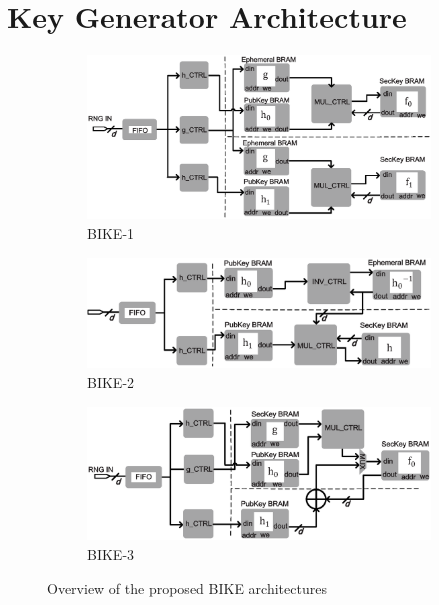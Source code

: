 \documentclass[runningheads]{llncs}
\begin{document}
\section{Key Generator Architecture}
\label{sec::keygen}
\begin{figure}[!tb]
\centering
\begin{subfigure}[t]{0.47\textwidth}\centering
\includegraphics[width=\textwidth]{./fig/BIKE-1.eps}
\caption{BIKE-1}
\label{fig:bike1}
\end{subfigure}
\hspace{1em}
\begin{subfigure}[t]{0.47\textwidth}\centering
\includegraphics[width=\textwidth]{./fig/BIKE-2.eps}
\caption{BIKE-2 }
\label{fig:bike2}
\end{subfigure}
\begin{subfigure}[t]{0.47\textwidth}\centering
\includegraphics[width=\textwidth]{./fig/BIKE-3.eps}
\caption{BIKE-3 }
\label{fig:bike3}
\end{subfigure}
\caption{Overview of the proposed BIKE architectures}
\end{figure}
\end{document}
